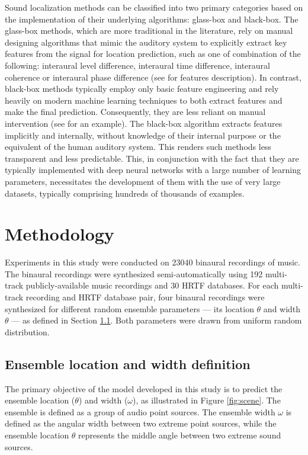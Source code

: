 \documentclass{article}
\begin{document}
Sound localization methods can be classified into two primary categories based on the implementation of their underlying algorithms: glass-box and black-box. The glass-box methods, which are more traditional in the literature, rely on manual designing algorithms that mimic the auditory system to explicitly extract key features from the signal for location prediction, such as one of combination of the following: interaural level difference, interaural time difference, interaural coherence or interaural phase difference (see \cite{blauert_spatial_1996} for features description). In contrast, black-box methods typically employ only basic feature engineering and rely heavily on modern machine learning techniques to both extract features and make the final prediction. Consequently, they are less reliant on manual intervention (see \cite{vecchiotti19} for an example). The black-box algorithm extracts features implicitly and internally, without knowledge of their internal purpose or the equivalent of the human auditory system. This renders such methods less transparent and less predictable. This, in conjunction with the fact that they are typically implemented with deep neural networks with a large number of learning parameters, necessitates the development of them with the use of very large datasets, typically comprising hundreds of thousands of examples.

\section{Methodology}
\label{sec:methodology}

Experiments in this study were conducted on 23040 binaural recordings of music. The binaural recordings were synthesized semi-automatically using 192 multi-track publicly-available music recordings and 30 HRTF databases. For each multi-track recording and HRTF database pair, four binaural recordings were synthesized for different random ensemble parameters --- its location $\theta$ and width $\theta$ --- as defined in Section \ref{subsec:ensemble-definition}. Both parameters were drawn from uniform random distribution.

\subsection{Ensemble location and width definition}
\label{subsec:ensemble-definition}

The primary objective of the model developed in this study is to predict the ensemble location ($\theta$) and width ($\omega$), as illustrated in Figure \ref{fig:scene}. The ensemble is defined as a group of audio point sources. The ensemble width $\omega$ is defined as the angular width between two extreme point sources, while the ensemble location $\theta$ represents the middle angle between two extreme sound sources.
\end{document}
